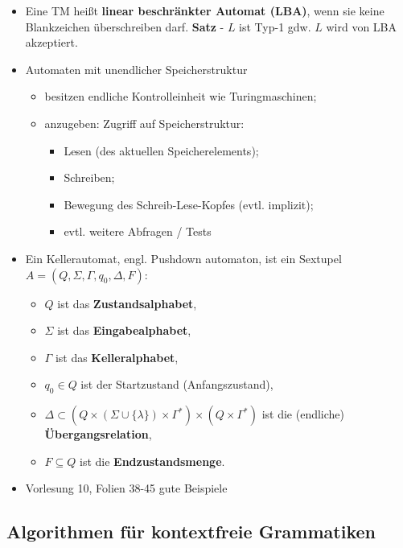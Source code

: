 \documentclass[12pt, a4paper]{article}
\begin{document}
\begin{itemize}
		\item Eine TM heißt \textbf{linear beschränkter Automat (LBA)}, wenn sie keine Blankzeichen
		überschreiben darf.
			\subitem \textbf{Satz} - $L$ ist Typ-1 gdw. $L$ wird von LBA akzeptiert.
		
		\item Automaten mit unendlicher Speicherstruktur
		\begin{itemize}
			\item besitzen endliche Kontrolleinheit wie Turingmaschinen;
			\item anzugeben: Zugriff auf Speicherstruktur:
			\begin{itemize}
				\item Lesen (des aktuellen Speicherelements);
				\item Schreiben;
				\item Bewegung des Schreib-Lese-Kopfes (evtl. implizit);
				\item evtl. weitere Abfragen / Tests
			\end{itemize}
		\end{itemize} 
		
		\item Ein Kellerautomat, engl. Pushdown automaton, ist ein Sextupel $A = (Q, \Sigma, \Gamma, q_{0}, \Delta, F)$:
		\begin{itemize}
			\item $Q$ ist das \textbf{Zustandsalphabet},
			\item $\Sigma$ ist das \textbf{Eingabealphabet},
			\item $\Gamma$ ist das \textbf{Kelleralphabet},
			\item $q_{0}\in Q$ ist der Startzustand (Anfangszustand),
			\item $\Delta\subset (Q\times(\Sigma\cup\{\lambda\})\times\Gamma^{*})\times(Q \times\Gamma^{*})$ ist die (endliche) \textbf{Übergangsrelation},
			\item $F \subseteq Q$ ist die \textbf{Endzustandsmenge}.
		\end{itemize}
	
		\item Vorlesung 10, Folien 38-45 gute Beispiele
		
		
	\end{itemize}
		
	\subsection{Algorithmen für kontextfreie Grammatiken}
	
\end{document}
